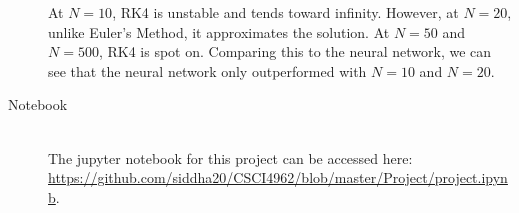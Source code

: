 \documentclass[12pt]{article}
\begin{document}
\begin{description}
\begin{minipage}{\linewidth}
    \end{minipage}
    At $N=10$, RK4 is unstable and tends toward infinity. However, at $N=20$,
    unlike Euler's Method, it approximates the solution. At $N=50$ and $N=500$,
    RK4 is spot on. Comparing this to the neural network, we can see that the
    neural network only outperformed with $N=10$ and $N=20$. 
    \item[Notebook] \hfill \\
    The jupyter notebook for this project can be accessed here: \\
    \url{https://github.com/siddha20/CSCI4962/blob/master/Project/project.ipynb}.
\end{description}
\end{document}
